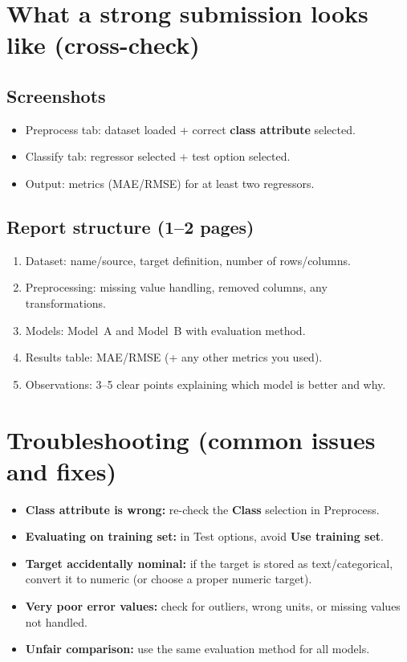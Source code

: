\documentclass[11pt]{article}
\begin{document}
\section{What a strong submission looks like (cross-check)}
\subsection{Screenshots}
\begin{itemize}[leftmargin=*]
  \item Preprocess tab: dataset loaded + correct \textbf{class attribute} selected.
  \item Classify tab: regressor selected + test option selected.
  \item Output: metrics (MAE/RMSE) for at least two regressors.
\end{itemize}

\subsection{Report structure (1--2 pages)}
\begin{enumerate}[leftmargin=*]
  \item Dataset: name/source, target definition, number of rows/columns.
  \item Preprocessing: missing value handling, removed columns, any transformations.
  \item Models: Model~A and Model~B with evaluation method.
  \item Results table: MAE/RMSE (+ any other metrics you used).
  \item Observations: 3--5 clear points explaining which model is better and why.
\end{enumerate}

\section{Troubleshooting (common issues and fixes)}
\begin{itemize}[leftmargin=*]
  \item \textbf{Class attribute is wrong:} re-check the \textbf{Class} selection in Preprocess.
  \item \textbf{Evaluating on training set:} in Test options, avoid \textbf{Use training set}.
  \item \textbf{Target accidentally nominal:} if the target is stored as text/categorical, convert it to numeric (or choose a proper numeric target).
  \item \textbf{Very poor error values:} check for outliers, wrong units, or missing values not handled.
  \item \textbf{Unfair comparison:} use the same evaluation method for all models.
\end{itemize}

\notesources{\AIMLLabSources}
\end{document}
